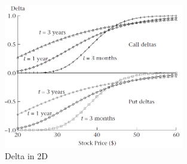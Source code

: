 \documentclass[hidelinks]{article}
\begin{document}
	\begin{figure}[!h]
	\centering
	
	\includegraphics[width=0.7\textwidth]{delta_2d.png}
	
	\caption{Delta in 2D}
	\label{fig:delta2d}
	\end{figure}
	
\end{document}
